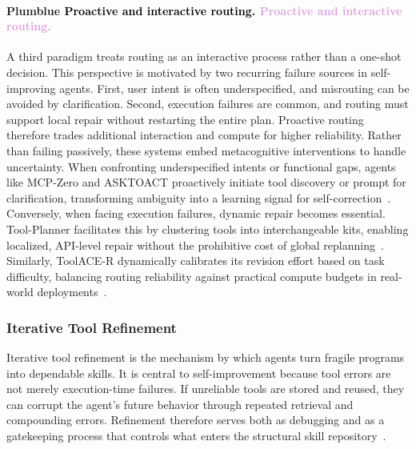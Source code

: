 \documentclass{article}
\let\oldtextcolor\textcolor
\renewcommand{\textcolor}[2]{
  \def\temp{#1}
  \def\red{blue}
  \ifx\temp\red
    \oldtextcolor{black}{#2}
  \else
    \oldtextcolor{#1}{#2}
  \fi
}
\begin{document}
\paragraph{\textcolor{Plum}{Proactive and interactive routing.}}
A third paradigm treats routing as an interactive process rather than a one-shot decision. This perspective is motivated by two recurring failure sources in self-improving agents. First, user intent is often underspecified, and misrouting can be avoided by clarification. Second, execution failures are common, and routing must support local repair without restarting the entire plan. Proactive routing therefore trades additional interaction and compute for higher reliability. Rather than failing passively, these systems embed metacognitive interventions to handle uncertainty. When confronting underspecified intents or functional gaps, agents like MCP-Zero and ASKTOACT proactively initiate tool discovery or prompt for clarification, transforming ambiguity into a learning signal for self-correction~\citep{fei2025mcpzeroactivetooldiscovery, zhang2025asktoactenhancingllmstool}. Conversely, when facing execution failures, dynamic repair becomes essential. Tool-Planner facilitates this by clustering tools into interchangeable kits, enabling localized, API-level repair without the prohibitive cost of global replanning~\citep{liu2025toolplannertaskplanningclusters}. Similarly, ToolACE-R dynamically calibrates its revision effort based on task difficulty, balancing routing reliability against practical compute budgets in real-world deployments~\citep{zeng2025toolacermodelawareiterativetraining}.

\subsubsection{Iterative Tool Refinement}
\label{sec:Iterative_Tool_Refinement}

Iterative tool refinement is the mechanism by which agents turn fragile programs into dependable skills. It is central to self-improvement because tool errors are not merely execution-time failures. If unreliable tools are stored and reused, they can corrupt the agent's future behavior through repeated retrieval and compounding errors. Refinement therefore serves both as debugging and as a gatekeeping process that controls what enters the structural skill repository~\citep{11185878, dolcetti2025helpingllmsimprovecode, petrovic2025surveygenaiautomotivesoftware}.
\end{document}
